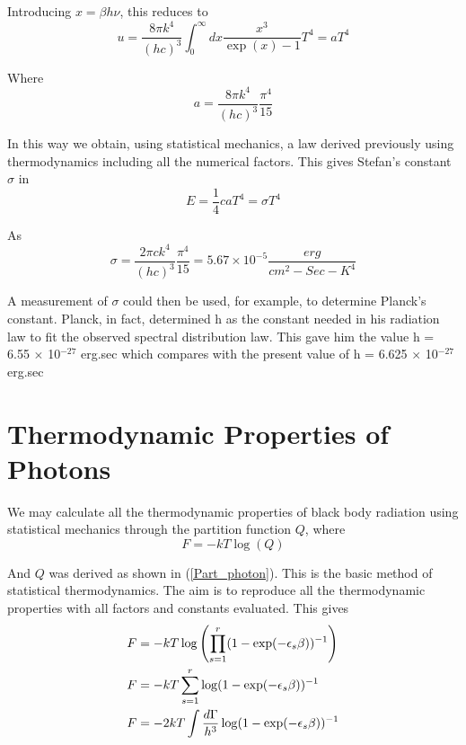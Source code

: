 \documentclass[book.tex]{subfiles}
\begin{document}
Introducing $x=\beta h\nu$, this reduces to
\begin{equation}\label{Eq34}
u = \frac{8\pi k^{4}}{(hc)^{3}} \int_0^{\infty} dx \frac{x^{3}}{\exp(x)-1} T^{4} = aT^{4}
\end{equation}

Where
\begin{equation}\label{Eq35}
a = \frac{8\pi k^{4}}{(hc)^{3}} \frac{\pi^{4}}{15}
\end{equation}

In this way we obtain, using statistical mechanics, a law derived previously using thermodynamics including all the numerical factors. This gives Stefan's constant $\sigma$ in 
\begin{equation}\label{Eq36}
E = \frac{1}{4} caT^{4} = \sigma T^{4}
\end{equation}

As
\begin{equation}\label{Eq37}
\sigma =  \frac{2\pi ck^{4}}{(hc)^{3}} \frac{\pi^{4}}{15} = 5.67 \times 10^{-5} \frac{erg}{cm^{2}-Sec-K^{4}}
\end{equation}

A measurement of $\sigma$ could then be used, for example, to determine Planck's constant. Planck, in fact, determined h as the constant needed in his radiation law to fit the observed spectral distribution law. This gave him the value h = 6.55 $\times$ 10$^{-27}$ erg.sec which compares with the present value of h = 6.625 $\times$ 10$^{-27}$ erg.sec

\section{Thermodynamic Properties of Photons}
We may calculate all the thermodynamic properties of black body radiation using statistical mechanics through the partition function $Q$, where
\begin{equation}\label{Eq38}
F =  -kT\log(Q)
\end{equation}

And $Q$ was derived as shown in (\ref{Part_photon}). This is the basic method of statistical thermodynamics. The aim is to reproduce all the thermodynamic properties with all factors and constants evaluated. This gives
\begin{align}\label{Eq39}
F &=  -kT\log\left(\prod_{s=1}^{r} (1-\exp(-\epsilon_{s}\beta))^{-1}\right) \notag \\
F &=  -kT\sum_{s=1}^{r} \log(1-\exp(-\epsilon_{s}\beta))^{-1} \notag \\
F &= -2kT  \int \frac{d\Gamma}{h^{3}} \log (1-\exp(-\epsilon_{s}\beta))^{-1} 
\end{align}
\end{document}
